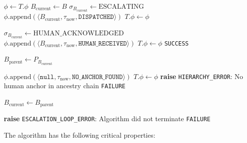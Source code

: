 \begin{algorithm}[htbp]
\caption{BailoutTrigger Escalation Algorithm}
\label{alg:bailout-escalation}
\begin{enumerate}\setlength\itemsep{0.2em}\setlength\topsep{0.2em}\setlength\partopsep{0em}
  \State $\phi \leftarrow T.\phi$ 
  \State $B_{\text{current}} \leftarrow B$ 
    \State $\sigma_{B_{\text{current}}} \leftarrow \text{ESCALATING}$
    \State $\phi.\text{append}(\langle B_{\text{current}}, \tau_{\text{now}}, \texttt{DISPATCHED} \rangle)$
    \State $T.\phi \leftarrow \phi$ 

      \State $\sigma_{B_{\text{current}}} \leftarrow \text{HUMAN\_ACKNOWLEDGED}$
      \State $\phi.\text{append}(\langle B_{\text{current}}, \tau_{\text{now}}, \texttt{HUMAN\_RECEIVED} \rangle)$
      \State $T.\phi \leftarrow \phi$
      \State \Return \texttt{SUCCESS}
    \EndIf

    \State $B_{\text{parent}} \leftarrow P_{B_{\text{current}}}$

      \State $\phi.\text{append}(\langle \texttt{null}, \tau_{\text{now}}, \texttt{NO\_ANCHOR\_FOUND} \rangle)$
      \State $T.\phi \leftarrow \phi$
      \State \textbf{raise} \texttt{HIERARCHY\_ERROR}: No human anchor in ancestry chain
      \State \Return \texttt{FAILURE}
    \EndIf

    \State $B_{\text{current}} \leftarrow B_{\text{parent}}$
  \EndWhile

  \State \textbf{raise} \texttt{ESCALATION\_LOOP\_ERROR}: Algorithm did not terminate
  \State \Return \texttt{FAILURE}
\EndFunction
\end{enumerate}
\end{algorithm}

\bigskip

The algorithm has the following critical properties:

